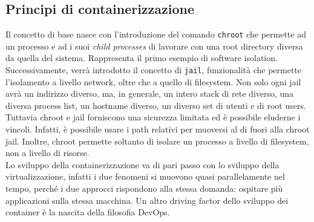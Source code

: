 \documentclass{article}
\begin{document}
		\subsection{Principi di containerizzazione}
		Il concetto di base nasce con l'introduzione del comando \verb|chroot| che permette ad un processo e ad i suoi \textit{child processes} di lavorare con una root directory diversa da quella del sistema. Rappresenta il primo esempio di software isolation.\\
		
		Successivamente, verrà introdotto il concetto di \verb*|jail|, funzionalità che permette l'isolamento a livello network, oltre che a quello di filesystem. Non solo ogni jail avrà un indirizzo diverso, ma, in generale, un intero stack di rete diverso, una diversa process list, un hostname diverso, un diverso set di utenti e di root users.\\
		
		Tuttavia chroot e jail forniscono una sicurezza limitata ed è possibile eluderne i vincoli. Infatti, è possibile usare i path
		relativi per muoversi al di fuori alla chroot jail. Inoltre, chroot permette soltanto di isolare un processo a livello di filesystem, non a livello di risorse.\\
		
		Lo sviluppo della containerizzazione va di pari passo con lo sviluppo della virtualizzazione, infatti i due fenomeni si muovono quasi parallelamente nel tempo, perché i due approcci rispondono alla stessa domanda: ospitare più applicazioni sulla stessa macchina. Un altro driving factor dello sviluppo dei container è la nascita della filosofia DevOps.
		
\end{document}
